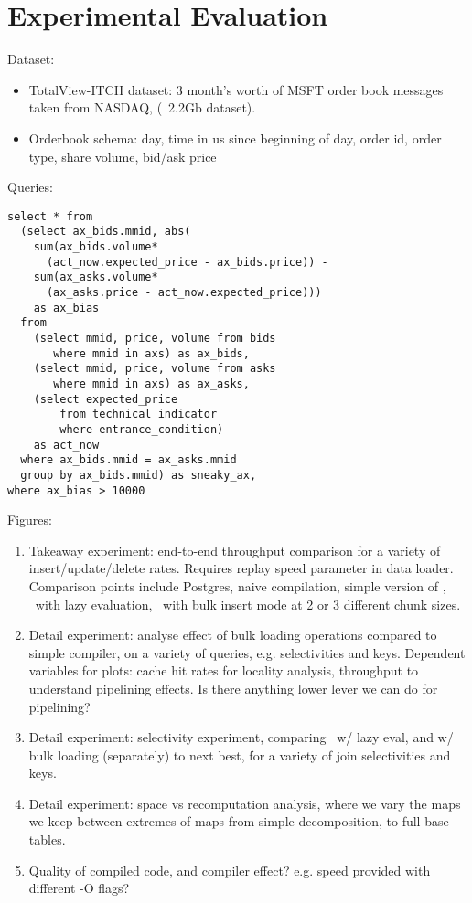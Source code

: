\section{Experimental Evaluation}

Dataset:

\begin{itemize}
  \item TotalView-ITCH dataset: 3 month's worth of MSFT order book messages
  taken from NASDAQ, (~2.2Gb dataset).
  \item Orderbook schema: day, time in us since beginning of day, order id,
  order type, share volume, bid/ask price
\end{itemize}

Queries:

\begin{verbatim}
select * from
  (select ax_bids.mmid, abs(
    sum(ax_bids.volume*
      (act_now.expected_price - ax_bids.price)) -
    sum(ax_asks.volume*
      (ax_asks.price - act_now.expected_price)))
    as ax_bias
  from
    (select mmid, price, volume from bids
       where mmid in axs) as ax_bids,
    (select mmid, price, volume from asks
       where mmid in axs) as ax_asks,
    (select expected_price
        from technical_indicator
        where entrance_condition)
    as act_now
  where ax_bids.mmid = ax_asks.mmid
  group by ax_bids.mmid) as sneaky_ax,
where ax_bias > 10000
\end{verbatim}

Figures:

\begin{enumerate}
  \item Takeaway experiment: end-to-end throughput comparison for a variety of
  insert/update/delete rates. Requires replay speed parameter in data loader.
  Comparison points include Postgres, naive compilation, simple version
  of \compiler, \compiler\ with lazy evaluation, \compiler\ with bulk insert
  mode at 2 or 3 different chunk sizes.

  \item Detail experiment: analyse effect of bulk loading operations compared to
  simple compiler, on a variety of queries, e.g. selectivities and keys.
  Dependent variables for plots: cache hit rates for locality analysis,
  throughput to understand pipelining effects. Is there anything lower lever we
  can do for pipelining?

  \item Detail experiment: selectivity experiment, comparing \compiler\ w/ lazy
  eval, and w/ bulk loading (separately) to next best, for a variety of
  join selectivities and keys.

  \item Detail experiment: space vs recomputation analysis, where we vary the
  maps we keep between extremes of maps from simple decomposition, to full base
  tables.

  \item Quality of compiled code, and compiler effect? e.g. speed provided with
  different -O flags?
\end{enumerate}